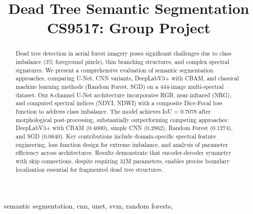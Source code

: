 \documentclass[conference,dvipsnames]{IEEEtran}
\begin{document}
\title{Dead Tree Semantic Segmentation\\
{\huge CS9517: Group Project}
}

\author{
\and

\and

\and


}

\maketitle

\begin{abstract}
   Dead tree detection in aerial forest imagery poses significant challenges due to class imbalance (3\% foreground pixels), thin branching structures, and complex spectral signatures. We present a comprehensive evaluation of semantic segmentation approaches, comparing U-Net, CNN variants, DeepLabV3+ with CBAM, and classical machine learning methods (Random Forest, SGD) on a 444-image multi-spectral dataset. Our 8-channel U-Net architecture incorporates RGB, near-infrared (NRG), and computed spectral indices (NDVI, NDWI) with a composite Dice-Focal loss function to address class imbalance. The model achieves IoU = 0.7078 after morphological post-processing, substantially outperforming competing approaches: DeepLabV3+ with CBAM (0.4000), simple CNN (0.2862), Random Forest (0.1274), and SGD (0.0640). Key contributions include domain-specific spectral feature engineering, loss function design for extreme imbalance, and analysis of parameter efficiency across architectures. Results demonstrate that encoder-decoder symmetry with skip connections, despite requiring 31M parameters, enables precise boundary localisation essential for fragmented dead tree structures. 
\end{abstract}

\begin{IEEEkeywords}
    semantic segmentation, cnn, unet, svm, random forests, 
\end{IEEEkeywords}














\end{document}
